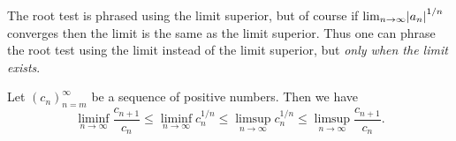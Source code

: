 \begin{note}
    The root test is phrased using the limit superior, but of course if \(\lim_{n \to \infty} \abs*{a_n}^{1 / n}\) converges then the limit is the same as the limit superior.
    Thus one can phrase the root test using the limit instead of the limit superior, but \emph{only when the limit exists}.
\end{note}

\begin{lemma}\label{7.5.2}
    Let \((c_n)_{n = m}^\infty\) be a sequence of positive numbers.
    Then we have
    \[
        \liminf_{n \to \infty} \frac{c_{n + 1}}{c_n} \leq \liminf_{n \to \infty} c_n^{1 / n} \leq \limsup_{n \to \infty} c_n^{1 / n} \leq \limsup_{n \to \infty} \frac{c_{n + 1}}{c_n}.
    \]
\end{lemma}

